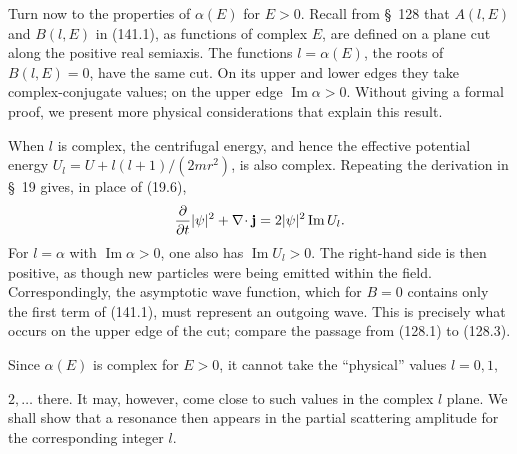 Turn now to the properties of $\alpha(E)$ for $E>0$. Recall from \S~128 that
$A(l,E)$ and $B(l,E)$ in (141.1), as functions of complex $E$, are defined on
a plane cut along the positive real semiaxis. The functions
$l=\alpha(E)$, the roots of $B(l,E)=0$, have the same cut. On its upper and
lower edges they take complex-conjugate values; on the upper edge
$\operatorname{Im}\alpha>0$. Without giving a formal proof, we present more
physical considerations that explain this result.

When $l$ is complex, the centrifugal energy, and hence the effective
potential energy $U_l=U+l(l+1)/(2mr^2)$, is also complex. Repeating the
derivation in \S~19 gives, in place of (19.6),
\[
 \frac{\partial}{\partial t}|\psi|^2+\nabla\!\cdot \mathbf j
 =2|\psi|^2\operatorname{Im}U_l.
\]
For $l=\alpha$ with $\operatorname{Im}\alpha>0$, one also has
$\operatorname{Im}U_l>0$. The right-hand side is then positive, as though new
particles were being emitted within the field. Correspondingly, the
asymptotic wave function, which for $B=0$ contains only the first term of
(141.1), must represent an outgoing wave. This is precisely what occurs on
the upper edge of the cut; compare the passage from (128.1) to (128.3).

Since $\alpha(E)$ is complex for $E>0$, it cannot take the ``physical'' values
$l=0,1,$

$2,\ldots$ there. It may, however, come close to such values in the complex
$l$ plane. We shall show that a resonance then appears in the partial
scattering amplitude for the corresponding integer $l$.

